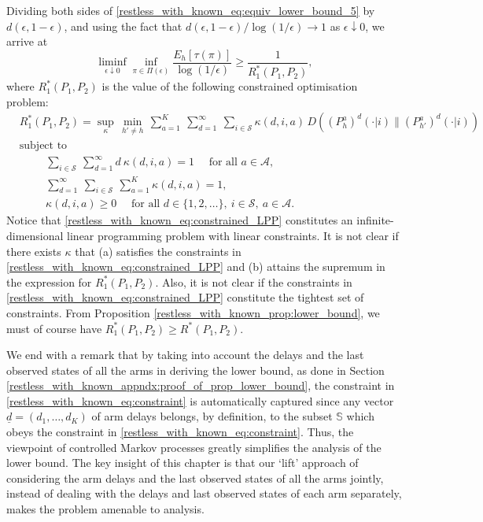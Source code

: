 Dividing both sides of \eqref{restless_with_known_eq:equiv_lower_bound_5} by $d(\epsilon,1-\epsilon)$, and using the fact that $d(\epsilon,1-\epsilon)/\log(1/\epsilon)\to 1$ as $\epsilon\downarrow 0$, we arrive at
\begin{equation}
	\liminf\limits_{\epsilon\downarrow 0}\inf\limits_{\pi\in\Pi(\epsilon)}\frac{E_h[\tau(\pi)]}{\log(1/\epsilon)}\geq \frac{1}{R_1^*(P_1,P_2)},\label{restless_with_known_eq:lower_bound_equiv}
\end{equation}
where $R_1^*(P_1,P_2)$ is the {\color{black} value} of the following constrained optimisation problem:
\begin{align}
	&R_1^*(P_1,P_2)=\sup\limits_{\kappa}\,\min\limits_{h'\neq h}\,\sum\limits_{a=1}^{K}~\sum\limits_{d=1}^{\infty}~\sum\limits_{i\in\mathcal{S}}\kappa(d,i,a)\, D((P_h^a)^{d}(\cdot|i)\|(P_{h'}^a)^{d}(\cdot|i))\nonumber\\
	&\text{subject to}\nonumber\\
	&\hspace{1cm}\sum\limits_{i\in\mathcal{S}}~\sum\limits_{d=1}^{\infty} d~\kappa(d,i,a)=1\quad \text{ for all }a\in\mathcal{A},\nonumber\\
	&\hspace{1cm} \sum\limits_{d=1}^{\infty}~\sum\limits_{i\in\mathcal{S}}~\sum\limits_{a=1}^K \kappa(d,i,a)=1,\nonumber\\
	&\hspace{1cm} \kappa(d,i,a)\geq 0\quad\text{ for all }d\in\{1,2,\ldots\},~i\in\mathcal{S},~a\in\mathcal{A}.\label{restless_with_known_eq:constrained_LPP}
\end{align}
Notice that \eqref{restless_with_known_eq:constrained_LPP} constitutes an infinite-dimensional linear programming problem with linear constraints. {\color{black} It is not clear if there exists $\kappa$ that (a) satisfies the constraints in \eqref{restless_with_known_eq:constrained_LPP} and (b) attains the supremum in the expression for $R_1^*(P_1, P_2)$}. Also, it is not clear if the constraints in \eqref{restless_with_known_eq:constrained_LPP} constitute the tightest set of constraints. From Proposition \ref{restless_with_known_prop:lower_bound}, we must of course have $R_1^*(P_1,P_2)\geq R^*(P_1,P_2)$.

We end with a remark that by taking into account the delays and the last observed states of all the arms in deriving the lower bound, as done in Section \ref{restless_with_known_appndx:proof_of_prop_lower_bound}, the constraint in \eqref{restless_with_known_eq:constraint} is automatically captured since any vector $\underline{d}=(d_1,\ldots,d_K)$ of arm delays belongs, by definition, to the subset $\mathbb{S}$ which obeys the constraint in  \eqref{restless_with_known_eq:constraint}. Thus, the viewpoint of controlled Markov processes greatly simplifies the analysis of the lower bound. The key insight of this chapter is that our `lift' approach of considering the arm delays and the last observed states of all the arms jointly, instead of dealing with the delays and last observed states of each arm separately, makes the problem amenable to analysis.

